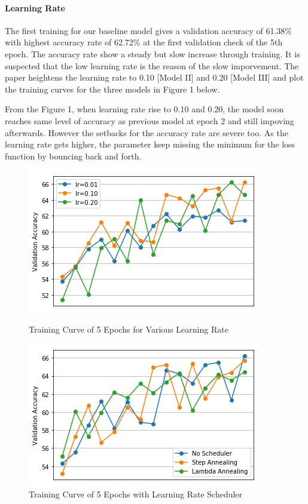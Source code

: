 \documentclass[10pt]{article}
\begin{document}
\paragraph{Learning Rate}
The first training for our baseline model gives a validation accuracy of 61.38\%  with highest accuracy rate of 62.72\%  at the first validation check of the 5th epoch. The accuracy rate show a steady but slow increase through training. It is suspected that the low learning rate is the reason of the slow imporvement. The paper heightens the learning rate to 0.10 [Model II] and 0.20 [Model III] and plot the training curves for the three models in Figure 1 below. \par
From the Figure 1, when learning rate rise to 0.10 and  0.20, the model soon reaches same level of accuracy as previous model at epoch 2 and still impoving afterwards. However the setbacks for the accuracy rate are severe too. As the learning rate gets higher, the parameter keep missing the minimum for the loss function by bouncing back and forth.\par
\begin{figure}[h]
\centering
\begin{minipage}{.4\textwidth}
  \includegraphics[width=\textwidth]{plot1}
  \caption{Training Curve of 5 Epochs for Various Learning Rate}
\end{minipage}%
\hfill
\begin{minipage}{.4\textwidth}
  \includegraphics[width=\textwidth]{plot2}
  \caption{Training Curve of 5 Epochs with Learning Rate Scheduler}
\end{minipage}
\end{figure}
\end{document}
